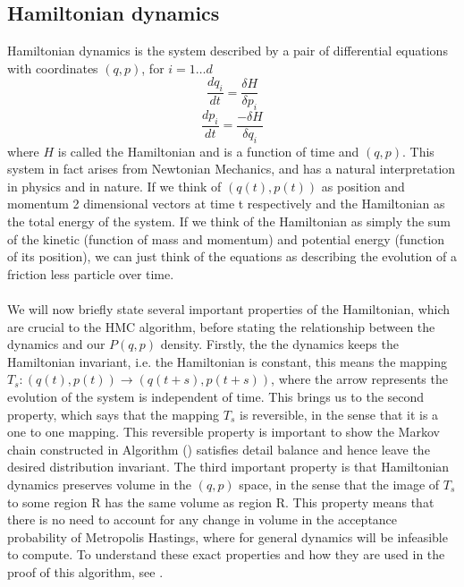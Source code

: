 \documentclass[11pt]{article}
\begin{document}
\subsection{Hamiltonian dynamics}
Hamiltonian dynamics is the system described by a pair of differential equations with coordinates $(q,p)$, for $i=1 \dots d$
\begin{equation}
\frac{dq_{i}}{dt} = \frac{\delta H}{\delta p_{i}}
\end{equation}
\begin{equation}
\frac{dp_{i}}{dt} = \frac{-\delta H}{\delta q_{i}}
\end{equation}
where $H$ is called the Hamiltonian and is a function of time and $(q,p)$. This system in fact arises from Newtonian Mechanics, and has a natural interpretation in physics and in nature. If we think of $(q(t),p(t))$ as position and momentum 2 dimensional vectors at time t respectively and the Hamiltonian as the total energy of the system. If we think of the Hamiltonian as simply the sum of the kinetic (function of mass and momentum) and potential energy (function of its position), we can just think of the equations as describing the evolution of a friction less particle over time.\\ \\
We will now briefly state several important properties of the Hamiltonian, which are crucial to the HMC algorithm, before stating the relationship between the dynamics and our $P(q,p)$ density. Firstly, the the dynamics keeps the Hamiltonian invariant, i.e. the Hamiltonian is constant, this means the mapping $T_s: (q(t),p(t)) \rightarrow (q(t+s),p(t+s))$, where the arrow represents the evolution of the system is independent of time. This brings us to the second property, which says that the mapping $T_s$ is reversible, in the sense that it is a one to one mapping. This reversible property is important to show the Markov chain constructed in Algorithm () satisfies detail balance and hence leave the desired distribution invariant. The third important property is that Hamiltonian dynamics preserves volume in the $(q,p)$ space, in the sense that the image of $T_s$ to some region R has the same volume as region R. This property means that there is no need to account for any change in volume in the acceptance probability of Metropolis Hastings, where for general dynamics will be infeasible to compute. To understand these exact properties and how they are used in the proof of this algorithm, see .
\end{document}
